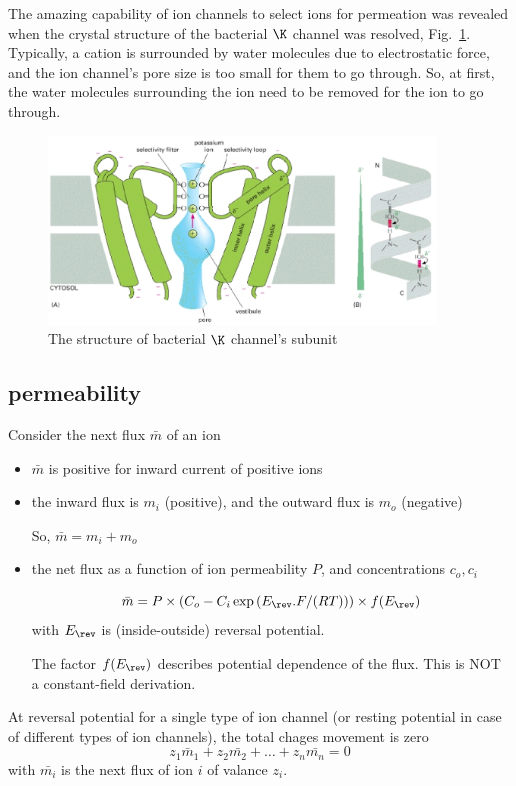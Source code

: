 The amazing capability of ion channels to select ions for permeation was
revealed when the crystal structure of the bacterial $\K$ channel was resolved,
Fig.~\ref{fig:KcsA_channel}. Typically, a cation is surrounded by water
molecules due to electrostatic force, and the ion channel's pore size is too
small for them to go through. So, at first, the water molecules surrounding
the ion need to be removed for the ion to go through.


\begin{figure}[hbt]
  \centerline{\includegraphics[height=5cm, angle=0]{./images/K_channel.eps}}
  \caption{The structure of bacterial $\K$ channel's subunit}
  \label{fig:KcsA_channel}
\end{figure}

\subsection{permeability}
\label{sec:permeability}


Consider the next flux $\bar{m}$ of an ion
\begin{itemize}
  \item $\bar{m}$ is positive for inward current of positive ions

  \item the inward flux is $m_i$ (positive), and the outward flux is $m_o$
  (negative)

  So, $\bar{m} = m_i + m_o$

  \item the net flux as a function of ion permeability $P$, and concentrations
  $c_o, c_i$

\begin{equation}
\label{eq:net-flux}
\bar{m} = P \times (C_o - C_i \exp\left( E_\rev.F/(RT) \right)) \times f(E_\rev)
\end{equation}
with $E_{\rev}$ is (inside-outside) reversal potential.

The factor $f(E_{\rev})$ describes potential dependence of the flux.
This is NOT a constant-field derivation.

\end{itemize}
At reversal potential for a single type of ion channel (or resting potential in
case of different types of ion channels), the total chages movement is zero
\begin{equation}
\label{eq:net-flux-balance}
z_1 \bar{m}_1 + z_2 \bar{m_2} + \ldots + z_n \bar{m_n} = 0
\end{equation}
with $\bar{m_i}$ is the next flux of ion $i$ of valance $z_i$.


